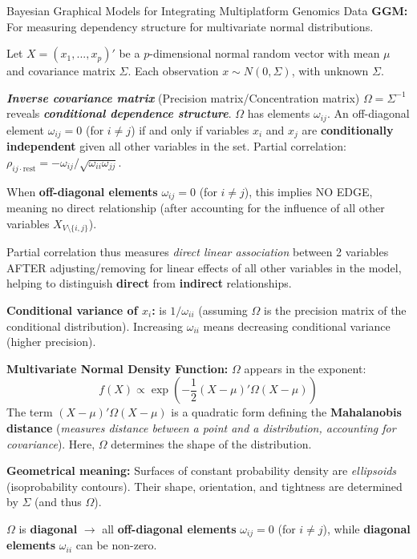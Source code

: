 \documentclass[twocolumn]{article}
\begin{document}
\begin{literaturepaper}{Bayesian Graphical Models for Integrating Multiplatform Genomics Data \cite{Wang_Baladandayuthapani_Holmes_Do_2013}}
    \textbf{GGM:} For measuring dependency structure for multivariate normal distributions.

    Let $X = (x_1,...,x_p)'$ be a $p$-dimensional normal random vector with mean $\mu$ and covariance matrix $\Sigma$.
    Each observation $x \sim N(0, \Sigma)$, with unknown $\Sigma$.
    
    \textbf{\textit{Inverse covariance matrix}} (Precision matrix/Concentration matrix) $\Omega = \Sigma^{-1}$ reveals \textbf{\textit{conditional dependence structure}}. $\Omega$ has elements $\omega_{ij}$.
    An off-diagonal element $\omega_{ij} = 0$ (for $i \neq j$) if and only if variables $x_i$ and $x_j$ are \textbf{conditionally independent} given all other variables in the set.
    Partial correlation: $\rho_{ij \cdot \text{rest}} = -\omega_{ij} / \sqrt{\omega_{ii}\omega_{jj}}$.

    When \textbf{off-diagonal elements} $\omega_{ij} = 0$ (for $i \neq j$), this implies NO EDGE, meaning no direct relationship (after accounting for the influence of all other variables $X_{V \setminus \{i,j\}}$).

    Partial correlation thus measures \textit{direct linear association} between 2 variables AFTER adjusting/removing for linear effects of all other variables in the model, helping to distinguish \textbf{direct} from \textbf{indirect} relationships.

    \textbf{Conditional variance of $x_i$:} is $1/\omega_{ii}$ (assuming $\Omega$ is the precision matrix of the conditional distribution). Increasing $\omega_{ii}$ means decreasing conditional variance (higher precision).

    \textbf{Multivariate Normal Density Function:} $\Omega$ appears in the exponent:
    \[f(X) \propto \exp\left(-\frac{1}{2}(X-\mu)'\Omega(X-\mu)\right)\]
    The term $(X-\mu)'\Omega(X-\mu)$ is a quadratic form defining the \textbf{Mahalanobis distance} (\textit{measures distance between a point and a distribution, accounting for covariance}). Here, $\Omega$ determines the shape of the distribution.

    \textbf{Geometrical meaning:} Surfaces of constant probability density are \textit{ellipsoids} (isoprobability contours). Their shape, orientation, and tightness are determined by $\Sigma$ (and thus $\Omega$).

    $\Omega$ is \textbf{diagonal} $\rightarrow$ all \textbf{off-diagonal elements} $\omega_{ij} = 0$ (for $i \neq j$), while \textbf{diagonal elements} $\omega_{ii}$ can be non-zero.


\end{literaturepaper}
\end{document}
